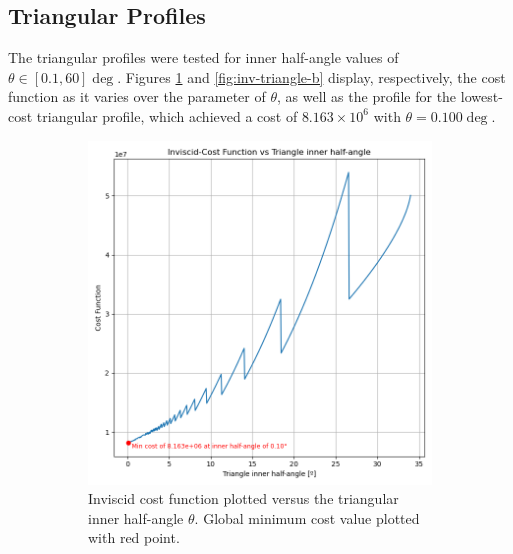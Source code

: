 \documentclass[11pt]{article}
\begin{document}
\subsection{Triangular Profiles}
The triangular profiles were tested for inner half-angle values of $\theta \in [0.1, 60]\deg$. Figures \ref{fig:inv-triangle-a} and \ref{fig:inv-triangle-b} display, respectively, the cost function as it varies over the parameter of $\theta$, as well as the profile for the lowest-cost triangular profile, which achieved a cost of $8.163 \times 10^6$ with $\theta=0.100\deg$.
\begin{figure}[H]
\centering
\begin{subfigure}[b]{0.45\textwidth}
    \centering
    \includegraphics[width=\linewidth]{../results/inviscid/triangles.png}
    \caption{Inviscid cost function plotted versus the triangular inner half-angle $\theta$. Global minimum cost value plotted with red point.}
    \label{fig:inv-triangle-a}
\end{subfigure}
\hfill
\begin{subfigure}[b]{0.45\textwidth}
    \centering

\end{subfigure}
\end{figure}
\end{document}
